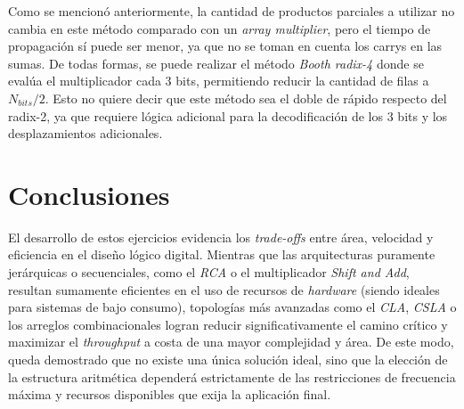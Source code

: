 \documentclass[12pt,a4paper]{article}
\begin{document}
Como se mencionó anteriormente, la cantidad de productos parciales a utilizar no cambia en este método comparado con un \emph{array multiplier}, pero el tiempo de propagación sí puede ser menor, ya que no se toman en cuenta los carrys en las sumas. De todas formas, se puede realizar el método \textit{Booth radix-4} donde se evalúa el multiplicador cada $3$ bits, permitiendo reducir la cantidad de filas a $N_{bits}/2$. Esto no quiere decir que este método sea el doble de rápido respecto del radix-2, ya que requiere lógica adicional para la decodificación de los $3$ bits y los desplazamientos adicionales.



\section{Conclusiones}                                              \label{sec_3}
El desarrollo de estos ejercicios evidencia los \textit{trade-offs} entre área, velocidad y eficiencia en el diseño lógico digital. Mientras que las arquitecturas puramente jerárquicas o secuenciales, como el \textit{RCA} o el multiplicador \textit{Shift and Add}, resultan sumamente eficientes en el uso de recursos de \textit{hardware} (siendo ideales para sistemas de bajo consumo), topologías más avanzadas como el \textit{CLA}, \textit{CSLA} o los arreglos combinacionales logran reducir significativamente el camino crítico y maximizar el \textit{throughput} a costa de una mayor complejidad y área. De este modo, queda demostrado que no existe una única solución ideal, sino que la elección de la estructura aritmética dependerá estrictamente de las restricciones de frecuencia máxima y recursos disponibles que exija la aplicación final.



\newpage
\nocite{*}
\printbibliography[heading=bibintoc, title={4. \ Referencias}]
\end{document}
